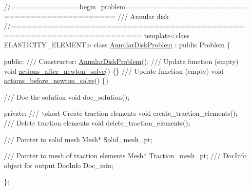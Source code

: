  
\begin{DoxyCodeInclude}
\textcolor{comment}{//=============begin\_problem============================================ }
\textcolor{comment}{/// Annular disk}
\textcolor{comment}{}\textcolor{comment}{//====================================================================== }
\textcolor{keyword}{template}<\textcolor{keyword}{class} ELASTICITY\_ELEMENT>
\textcolor{keyword}{class }\hyperlink{classAnnularDiskProblem}{AnnularDiskProblem} : \textcolor{keyword}{public} Problem
\{

\textcolor{keyword}{public}:
\textcolor{comment}{}
\textcolor{comment}{ /// Constructor:}
\textcolor{comment}{} \hyperlink{classAnnularDiskProblem_aad1ce56fa5c26045fb14d46acf29c89e}{AnnularDiskProblem}();
 \textcolor{comment}{}
\textcolor{comment}{ /// Update function (empty)}
\textcolor{comment}{} \textcolor{keywordtype}{void} \hyperlink{classAnnularDiskProblem_a35d3a481c66849a57b9797c2338b8fc2}{actions\_after\_newton\_solve}() \{\}
\textcolor{comment}{}
\textcolor{comment}{ /// Update function (empty)}
\textcolor{comment}{} \textcolor{keywordtype}{void} \hyperlink{classAnnularDiskProblem_a147e5fbe37f7132bbace2b713acb03a5}{actions\_before\_newton\_solve}() \{\}

\end{DoxyCodeInclude}



\begin{DoxyCodeInclude}
 \textcolor{comment}{/// Doc the solution}
 \textcolor{keywordtype}{void} doc\_solution();

\textcolor{keyword}{private}:
\textcolor{comment}{}
\textcolor{comment}{ /// \(\backslash\)short Create traction elements}
\textcolor{comment}{} \textcolor{keywordtype}{void} create\_traction\_elements();
\textcolor{comment}{}
\textcolor{comment}{ /// Delete traction elements}
\textcolor{comment}{} \textcolor{keywordtype}{void} delete\_traction\_elements();

\end{DoxyCodeInclude}



\begin{DoxyCodeInclude}
 \textcolor{comment}{/// Pointer to solid mesh}
 Mesh* Solid\_mesh\_pt;

\end{DoxyCodeInclude}



\begin{DoxyCodeInclude}
 \textcolor{comment}{/// Pointer to mesh of traction elements}
 Mesh* Traction\_mesh\_pt;
\textcolor{comment}{}
\textcolor{comment}{ /// DocInfo object for output}
\textcolor{comment}{} DocInfo Doc\_info;
 
\};

\end{DoxyCodeInclude}




